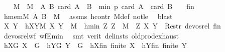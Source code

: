 \begin{isabellebody}
\ \ \isamarkupfalse%
\ M\ \ {\isachardoublequoteopen}M\ {\isacharequal}{\kern0pt}\ {\isacharbraceleft}{\kern0pt}{\isacharparenleft}{\kern0pt}A{\isacharcomma}{\kern0pt}\ B{\isacharparenright}{\kern0pt}{\isachardot}{\kern0pt}\ card\ {\isacharparenleft}{\kern0pt}A\ {\isasymcdots}\ B{\isacharparenright}{\kern0pt}\ {\isacharless}{\kern0pt}\ min\ p\ {\isacharparenleft}{\kern0pt}card\ A\ {\isacharplus}{\kern0pt}\ card\ B\ {\isacharminus}{\kern0pt}\ {}{\isacharparenright}{\kern0pt}{\isacharbraceright}{\kern0pt}\ {\isasyminter}\ {\isacharquery}{\kern0pt}fin{\isachardoublequoteclose}\ \isanewline
\ \ \isamarkupfalse%
\ hmemM{\isacharcolon}{\kern0pt}\ {\isachardoublequoteopen}{\isacharparenleft}{\kern0pt}A{\isacharcomma}{\kern0pt}\ B{\isacharparenright}{\kern0pt}\ {\isasymin}\ M{\isachardoublequoteclose}\ \isamarkupfalse%
\ assms\ hcontr\ M{\isacharunderscore}{\kern0pt}def\ not{\isacharunderscore}{\kern0pt}le\ \isamarkupfalse%
\ blast\isanewline
\ \ \isamarkupfalse%
\ \isamarkupfalse%
\ X\ Y\ \ hXYM{\isacharcolon}{\kern0pt}\ {\isachardoublequoteopen}{\isacharparenleft}{\kern0pt}X{\isacharcomma}{\kern0pt}\ Y{\isacharparenright}{\kern0pt}\ {\isasymin}\ M{\isachardoublequoteclose}\ \ hmin{\isacharcolon}{\kern0pt}\ {\isachardoublequoteopen}{\isasymAnd}Z{\isachardot}{\kern0pt}\ Z\ {\isasymin}\ M\ {\isasymLongrightarrow}\ {\isacharparenleft}{\kern0pt}Z{\isacharcomma}{\kern0pt}\ {\isacharparenleft}{\kern0pt}X{\isacharcomma}{\kern0pt}\ Y{\isacharparenright}{\kern0pt}{\isacharparenright}{\kern0pt}\ {\isasymnotin}\ Restr\ devos{\isacharunderscore}{\kern0pt}rel\ {\isacharquery}{\kern0pt}fin{\isachardoublequoteclose}\ \isanewline
\ \ \ \ \isamarkupfalse%
\ devos{\isacharunderscore}{\kern0pt}rel{\isacharunderscore}{\kern0pt}wf\ wfE{\isacharunderscore}{\kern0pt}min\ \isamarkupfalse%
\ {\isacharparenleft}{\kern0pt}smt\ {\isacharparenleft}{\kern0pt}verit{\isacharcomma}{\kern0pt}\ del{\isacharunderscore}{\kern0pt}insts{\isacharparenright}{\kern0pt}\ old{\isachardot}{\kern0pt}prod{\isachardot}{\kern0pt}exhaust{\isacharparenright}{\kern0pt}\isanewline
\ \ \isamarkupfalse%
\ hXG{\isacharcolon}{\kern0pt}\ {\isachardoublequoteopen}X\ {\isasymsubseteq}\ G{\isachardoublequoteclose}\ \ hYG{\isacharcolon}{\kern0pt}\ {\isachardoublequoteopen}Y\ {\isasymsubseteq}\ G{\isachardoublequoteclose}\ \ hXfin{\isacharcolon}{\kern0pt}\ {\isachardoublequoteopen}finite\ X{\isachardoublequoteclose}\ \ hYfin{\isacharcolon}{\kern0pt}\ {\isachardoublequoteopen}finite\ Y{\isachardoublequoteclose}\ \ \isanewline

\end{isabellebody}
